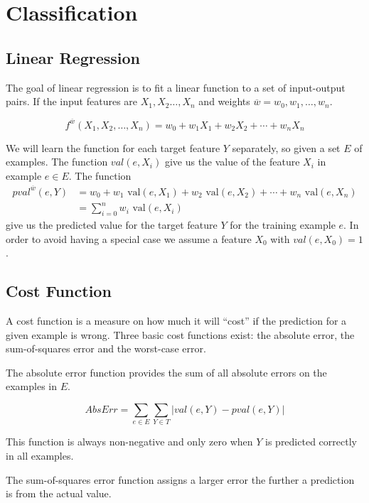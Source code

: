 \section{Classification}\label{sec:classification}



\subsection{Linear Regression}\label{sec:linreg}
The goal of linear regression is to fit a linear function to a set of input-output pairs. 
If the input features are $X_1,X_2 \dots, X_n$ and weights $\overline{w} = w_0, w_1, \dots, w_n$.

\[f^{\overline{w}}(X_1,X_2, \dots, X_n) = w_0 + w_1 X_1 + w_2 X_2 + \cdots + w_n X_n \]

We will learn the function for each target feature $Y$ separately, so given a set $E$ of examples.
The function $val(e,X_i)$ give us the value of the feature $X_i$ in example $e \in E$. The function 
\begin{align*}
pval^{\overline{w}}(e,Y) &= w_0 + w_1 \text{ val}(e,X_1) + w_2 \text{ val}(e,X_2) + \cdots + w_n \text{ val}(e,X_n) \\
&= \sum^n_{i=0} w_i \text{ val}(e,X_i)
\end{align*}
give us the predicted value for the target feature $Y$ for the training example $e$.
In order to avoid having a special case we assume a feature $X_0$ with $val(e,X_0)=1$.~\cite[p. 304]{AI2010}


\subsection{Cost Function}\label{sec:costfun}
A cost function is a measure on how much it will ``cost'' if the prediction for a given example is wrong.
Three basic cost functions exist: the absolute error, the sum-of-squares error and 
the worst-case error.

The absolute error function provides the sum of all absolute errors on the examples in $E$.

\[AbsErr = \sum_{e \in E}\sum_{Y \in T} |val(e,Y) - pval(e,Y)|\]

This function is always non-negative and only zero when $Y$ is predicted correctly in all examples. 

The sum-of-squares error function assigns a larger error the further a prediction is from the actual value.

